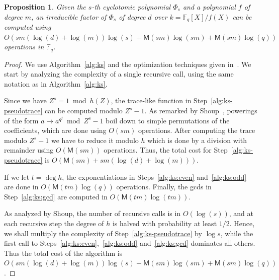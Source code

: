 \documentclass[12pt]{article}
\theoremstyle{plain}
\newtheorem{proposition}[theorem]{Proposition}
\theoremstyle{definition}
\def\F{\ensuremath{\mathbb{F}}}
\def\MM{\ensuremath{\mathsf{M}}}
\newcounter{algorithm}
\begin{document}
\begin{proposition}
  \label{prop:cyclo}
  Given the $s$-th cyclotomic polynomial $\Phi_s$ and a polynomial $f$ of degree $m$,
  an irreducible factor of $\Phi_s$ of degree $d$ over $k=\F_q[X]/f(X)$ 
  can be computed using $O(sm(\log(d)+\log(m))\log(s) + \MM(sm)\log(sm) + 
  \MM(sm)\log(q))$ operations in $\F_q$.
\end{proposition}
\begin{proof}
  We use Algorithm~\ref{alg:ks} and the optimization techniques given
  in~\cite{shoup94}. We start by analyzing the complexity of a single
  recursive call, using the same notation as in
  Algorithm~\ref{alg:ks}.

  Since we have $Z^s = 1\bmod h(Z)$, the trace-like function in
  Step~\ref{alg:ks-pseudotrace} can be computed modulo $Z^s - 1$. As
  remarked by Shoup~\cite{shoup94}, powerings of the form
  $a\mapsto a^{q^j} \bmod Z^s-1$ boil down to simple permutations of
  the coefficients, which are done using $O(sm)$ operations. After
  computing the trace modulo $Z^s - 1$ we have to reduce it modulo $h$
  which is done by a division with remainder using $O(\MM(sm))$
  operations.  Thus, the total cost for Step~\ref{alg:ks-pseudotrace}
  is $O(\MM(sm) + sm(\log(d)+\log(m)))$.

  If we let $t=\deg h$, the exponentiations in Steps~\ref{alg:ks:even}
  and~\ref{alg:ks:odd} are done in $O(\MM(tm)\log(q))$
  operations. Finally, the gcds in Step~\ref{alg:ks:gcd} are computed
  in $O(\MM(tm)\log(tm))$.

  As analyzed by Shoup, the number of recursive calls is in
  $O(\log(s))$, and at each recursive step the degree of $h$ is halved
  with probability at least $1/2$. Hence, we shall multiply the
  complexity of Step~\ref{alg:ks-pseudotrace} by
  $\log s$, while the first call to Steps~\ref{alg:ks:even},~\ref{alg:ks:odd}
  and~\ref{alg:ks:gcd} dominates all others. Thus the total cost of the algorithm is
  $O(sm(\log(d)+\log(m))\log(s) + \MM(sm)\log(sm) + \MM(sm)\log(q))$.
\end{proof}
\end{document}
